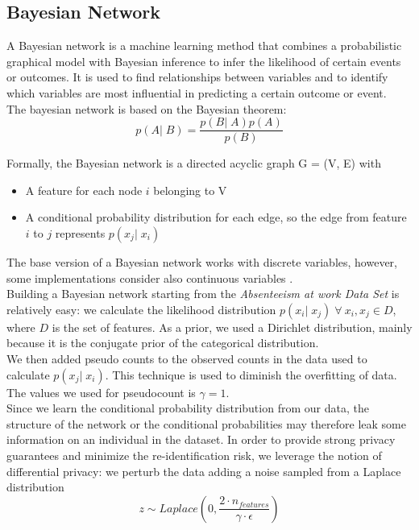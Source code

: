 \subsection{Bayesian Network}
A Bayesian network is a machine learning method that combines a probabilistic graphical model with Bayesian inference to infer the likelihood of certain events or outcomes. It is used to find relationships between variables and to identify which variables are most influential in predicting a certain outcome or event. \\
The bayesian network is based on the Bayesian theorem:
\begin{equation*}
    p(A|\;B) = \frac{p(B|\;A)p(A)}{p(B)}
\end{equation*}

Formally, the Bayesian network is a directed acyclic graph G = (V, E) with
\begin{itemize}
    \item A feature for each node $i$ belonging to V
    \item A conditional probability distribution for each edge, so the edge from feature $i$ to $j$ represents $p(x_j|\;x_i)$
  \end{itemize}
The base version of a Bayesian network works with discrete variables, however, some implementations consider also continuous variables \cite{chen2017learning}.\\
Building a Bayesian network starting from the \textit{Absenteeism at work Data Set} is relatively easy: we calculate the likelihood distribution $p(x_i|\;x_j)\;\forall\:x_i, x_j \in D$, where $D$ is the set of features. As a prior, we used a Dirichlet distribution, mainly because it is the conjugate prior of the categorical distribution. \\
We then added pseudo counts to the observed counts in the data used to calculate $p(x_j|\;x_i)$. This technique is used to diminish the overfitting of data. The values we used for pseudocount is $\gamma=1$. \\
Since we learn the conditional probability distribution from our data, the structure of the network or the conditional probabilities may therefore leak some information on an individual in the dataset. In order to provide strong privacy guarantees and minimize the re-identification risk, we leverage the notion of differential privacy: we perturb the data adding a noise sampled from a Laplace distribution 
\begin{equation*}
    z \sim Laplace \left(0, \frac{2 \cdot n_{features}}{\gamma \cdot \epsilon} \right)
\end{equation*}
